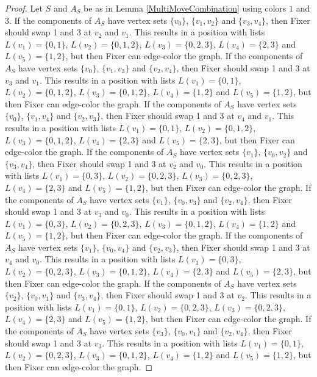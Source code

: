 \documentclass[12pt]{amsart}
\theoremstyle{plain}
\theoremstyle{definition}
\theoremstyle{remark}
\begin{document}
\begin{proof}
Let $S$ and $A_S$ be as in Lemma \ref{MultiMoveCombination} using colors $1$ and $3$. If the components of $A_S$ have vertex sets $\{v_0\}$, $\{v_1, v_2\}$ and $\{v_3, v_4\}$, then Fixer should swap 1 and 3 at $v_2$ and $v_1$. This results in a position with lists $L(v_1) = \{0, 1\}$, $L(v_2) = \{0, 1, 2\}$, $L(v_3) = \{0, 2, 3\}$, $L(v_4) = \{2, 3\}$ and $L(v_5) = \{1, 2\}$, but then Fixer can edge-color the graph.
If the components of $A_S$ have vertex sets $\{v_0\}$, $\{v_1, v_3\}$ and $\{v_2, v_4\}$, then Fixer should swap 1 and 3 at $v_3$ and $v_1$. This results in a position with lists $L(v_1) = \{0, 1\}$, $L(v_2) = \{0, 1, 2\}$, $L(v_3) = \{0, 1, 2\}$, $L(v_4) = \{1, 2\}$ and $L(v_5) = \{1, 2\}$, but then Fixer can edge-color the graph.
If the components of $A_S$ have vertex sets $\{v_0\}$, $\{v_1, v_4\}$ and $\{v_2, v_3\}$, then Fixer should swap 1 and 3 at $v_4$ and $v_1$. This results in a position with lists $L(v_1) = \{0, 1\}$, $L(v_2) = \{0, 1, 2\}$, $L(v_3) = \{0, 1, 2\}$, $L(v_4) = \{2, 3\}$ and $L(v_5) = \{2, 3\}$, but then Fixer can edge-color the graph.
If the components of $A_S$ have vertex sets $\{v_1\}$, $\{v_0, v_2\}$ and $\{v_3, v_4\}$, then Fixer should swap 1 and 3 at $v_2$ and $v_0$. This results in a position with lists $L(v_1) = \{0, 3\}$, $L(v_2) = \{0, 2, 3\}$, $L(v_3) = \{0, 2, 3\}$, $L(v_4) = \{2, 3\}$ and $L(v_5) = \{1, 2\}$, but then Fixer can edge-color the graph.
If the components of $A_S$ have vertex sets $\{v_1\}$, $\{v_0, v_3\}$ and $\{v_2, v_4\}$, then Fixer should swap 1 and 3 at $v_3$ and $v_0$. This results in a position with lists $L(v_1) = \{0, 3\}$, $L(v_2) = \{0, 2, 3\}$, $L(v_3) = \{0, 1, 2\}$, $L(v_4) = \{1, 2\}$ and $L(v_5) = \{1, 2\}$, but then Fixer can edge-color the graph.
If the components of $A_S$ have vertex sets $\{v_1\}$, $\{v_0, v_4\}$ and $\{v_2, v_3\}$, then Fixer should swap 1 and 3 at $v_4$ and $v_0$. This results in a position with lists $L(v_1) = \{0, 3\}$, $L(v_2) = \{0, 2, 3\}$, $L(v_3) = \{0, 1, 2\}$, $L(v_4) = \{2, 3\}$ and $L(v_5) = \{2, 3\}$, but then Fixer can edge-color the graph.
If the components of $A_S$ have vertex sets $\{v_2\}$, $\{v_0, v_1\}$ and $\{v_3, v_4\}$, then Fixer should swap 1 and 3 at $v_2$. This results in a position with lists $L(v_1) = \{0, 1\}$, $L(v_2) = \{0, 2, 3\}$, $L(v_3) = \{0, 2, 3\}$, $L(v_4) = \{2, 3\}$ and $L(v_5) = \{1, 2\}$, but then Fixer can edge-color the graph.
If the components of $A_S$ have vertex sets $\{v_3\}$, $\{v_0, v_1\}$ and $\{v_2, v_4\}$, then Fixer should swap 1 and 3 at $v_3$. This results in a position with lists $L(v_1) = \{0, 1\}$, $L(v_2) = \{0, 2, 3\}$, $L(v_3) = \{0, 1, 2\}$, $L(v_4) = \{1, 2\}$ and $L(v_5) = \{1, 2\}$, but then Fixer can edge-color the graph.

\end{proof}
\end{document}

